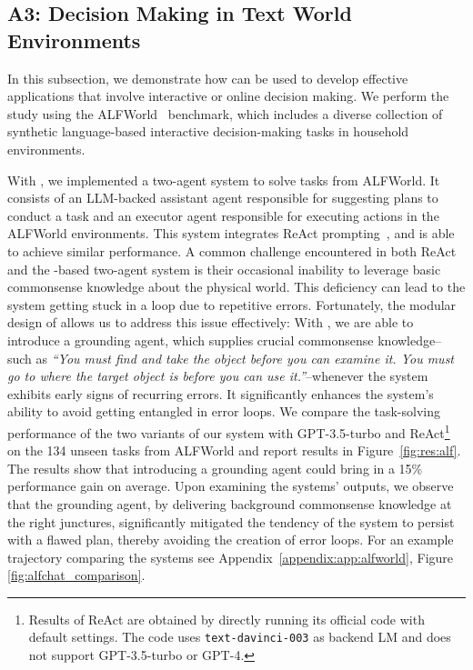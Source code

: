 \subsection*{A3: Decision Making in Text World Environments} 
\label{sec:app:alfworld}
In this subsection, we demonstrate how \libName can be used to develop effective applications that involve interactive or online decision making. We perform the study using the ALFWorld~\cite{ALFWorld20} benchmark, which includes a diverse collection of synthetic language-based interactive decision-making tasks in household environments. 

With \libName, we implemented a two-agent system to solve tasks from  ALFWorld. It consists of an LLM-backed assistant agent responsible for suggesting plans to conduct a task and an executor agent responsible for executing actions in the ALFWorld environments. This system integrates ReAct prompting~\cite{yao2022react}, 
and is able to achieve similar performance. A common challenge encountered in both ReAct and the \libName-based two-agent system is their occasional inability to leverage basic commonsense knowledge about the physical world. This deficiency can lead to the system getting stuck in a loop due to repetitive errors. Fortunately, the modular design of \libName allows us to address this issue effectively: With \libName, we are able to introduce a grounding agent, which supplies crucial commonsense knowledge--such as \emph{“You must find and take the object before you can examine it. You must go to where the target object is before you can use it.”}--whenever the system exhibits early signs of recurring errors. It significantly enhances the system's ability to avoid getting entangled in error loops.
We compare the task-solving performance of the two variants of our system with GPT-3.5-turbo and ReAct\footnote{Results of ReAct are obtained by directly running its official code with default settings. The code uses \texttt{text-davinci-003} as backend LM and does not support GPT-3.5-turbo or GPT-4.} on the 134 unseen tasks from ALFWorld and report results in Figure~\ref{fig:res:alf}. The results show that introducing a grounding agent could bring in a 15\% performance gain on average. Upon examining the systems' outputs, we observe that the grounding agent, by delivering background commonsense knowledge at the right junctures, significantly mitigated the tendency of the system to persist with a flawed plan, thereby avoiding the creation of error loops. For an example trajectory comparing the systems see Appendix~\ref{appendix:app:alfworld}, Figure \ref{fig:alfchat_comparison}.

